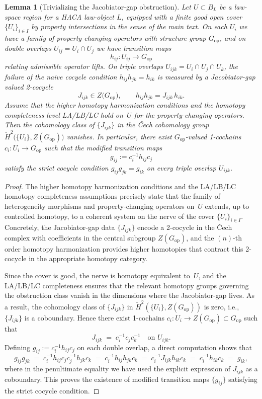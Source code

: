 \documentclass[11pt]{book}
\theoremstyle{plain}
\newtheorem{lemma}[theorem]{Lemma}
\theoremstyle{definition}
\theoremstyle{remark}
\begin{document}
\begin{lemma}[Trivializing the Jacobiator-gap obstruction]
\label{app:lem-jacobiator-gap-trivialization}
Let $U \subset B_L$ be a law-space region for a HACA law-object $L$,
equipped with a finite good open cover $\{U_i\}_{i\in I}$ by property
intersections in the sense of the main text. On each $U_i$ we have a
family of property-changing operators with structure group
$G_{\mathrm{op}}$, and on double overlaps $U_{ij} = U_i \cap U_j$ we
have transition maps
\[
  h_{ij} \colon U_{ij} \longrightarrow G_{\mathrm{op}}
\]
relating admissible operator lifts. On triple overlaps
$U_{ijk} = U_i \cap U_j \cap U_k$, the failure of the naive cocycle
condition $h_{ij}h_{jk} = h_{ik}$ is measured by a Jacobiator-gap
valued 2-cocycle
\[
  J_{ijk} \in Z\bigl(G_{\mathrm{op}}\bigr),
  \qquad
  h_{ij}h_{jk} = J_{ijk}\,h_{ik}.
\]
Assume that the higher homotopy harmonization conditions and the
homotopy completeness level LA/LB/LC hold on~$U$ for the
property-changing operators. Then the cohomology class of
$\{J_{ijk}\}$ in the Čech cohomology group
$\check{H}^2\bigl(\{U_i\},Z(G_{\mathrm{op}})\bigr)$ vanishes. In
particular, there exist $G_{\mathrm{op}}$-valued 1-cochains
$c_i \colon U_i \to G_{\mathrm{op}}$ such that the modified transition
maps
\[
  g_{ij} := c_i^{-1} h_{ij} c_j
\]
satisfy the strict cocycle condition
$g_{ij}g_{jk} = g_{ik}$ on every triple overlap $U_{ijk}$.
\end{lemma}

\begin{proof}
The higher homotopy harmonization conditions and the LA/LB/LC
homotopy completeness assumptions precisely state that the family of
heterogeneity morphisms and property-changing operators on~$U$
extends, up to controlled homotopy, to a coherent system on the nerve
of the cover $\{U_i\}_{i\in I}$. Concretely, the Jacobiator-gap data
$\{J_{ijk}\}$ encode a 2-cocycle in the Čech complex with coefficients
in the central subgroup $Z(G_{\mathrm{op}})$, and the $(n)$-th order
homotopy harmonization provides higher homotopies that contract this
2-cocycle in the appropriate homotopy category.

Since the cover is good, the nerve is homotopy equivalent to~$U$, and
the LA/LB/LC completeness ensures that the relevant homotopy groups
governing the obstruction class vanish in the dimensions where the
Jacobiator-gap lives. As a result, the cohomology class of
$\{J_{ijk}\}$ in $\check{H}^2(\{U_i\},Z(G_{\mathrm{op}}))$ is zero,
i.e., $\{J_{ijk}\}$ is a coboundary. Hence there exist 1-cochains
$c_i \colon U_i \to Z(G_{\mathrm{op}}) \subset G_{\mathrm{op}}$ such
that
\[
  J_{ijk}
  \;=\;
  c_i^{-1} c_j c_k^{-1}
  \quad\text{on }U_{ijk}.
\]
Defining $g_{ij} := c_i^{-1} h_{ij} c_j$ on each double overlap, a
direct computation shows that
\[
  g_{ij} g_{jk}
  \;=\;
  c_i^{-1} h_{ij} c_j c_j^{-1} h_{jk} c_k
  \;=\;
  c_i^{-1} h_{ij} h_{jk} c_k
  \;=\;
  c_i^{-1} J_{ijk} h_{ik} c_k
  \;=\;
  c_i^{-1} h_{ik} c_k
  \;=\;
  g_{ik},
\]
where in the penultimate equality we have used the explicit expression
of $J_{ijk}$ as a coboundary. This proves the existence of modified
transition maps $\{g_{ij}\}$ satisfying the strict cocycle condition.
\end{proof}
\end{document}
